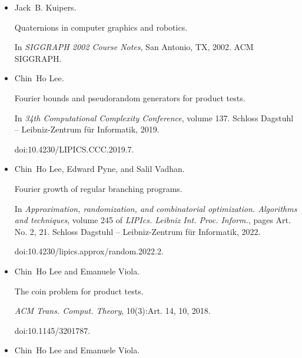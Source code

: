 \documentclass[10pt,a4paper]{article}
\begin{document}
\begin{itemize}
In \emph{STOC}, pages 263–272. ACM, 2011.


doi:10.1145/1993636.1993672.





\item[] 
[26]

Jack B. Kuipers.


Quaternions in computer graphics and robotics.


In \emph{SIGGRAPH 2002 Course Notes}, San Antonio, TX, 2002. ACM
SIGGRAPH.





\item[] 
[27]

Chin Ho Lee.


Fourier bounds and pseudorandom generators for product tests.


In \emph{34th Computational Complexity Conference}, volume 137.
Schloss Dagstuhl – Leibniz-Zentrum für Informatik, 2019.


doi:10.4230/LIPICS.CCC.2019.7.





\item[] 
[28]

Chin Ho Lee, Edward Pyne, and Salil Vadhan.


Fourier growth of regular branching programs.


In \emph{Approximation, randomization, and combinatorial optimization.
Algorithms and techniques}, volume 245 of \emph{LIPIcs. Leibniz Int. Proc.
Inform.}, pages Art. No. 2, 21. Schloss Dagstuhl – Leibniz-Zentrum für
Informatik, 2022.


doi:10.4230/lipics.approx/random.2022.2.





\item[] 
[29]

Chin Ho Lee and Emanuele Viola.


The coin problem for product tests.


\emph{ACM Trans. Comput. Theory}, 10(3):Art. 14, 10, 2018.


doi:10.1145/3201787.





\item[] 
[30]

Chin Ho Lee and Emanuele Viola.



\end{itemize}
\end{document}
